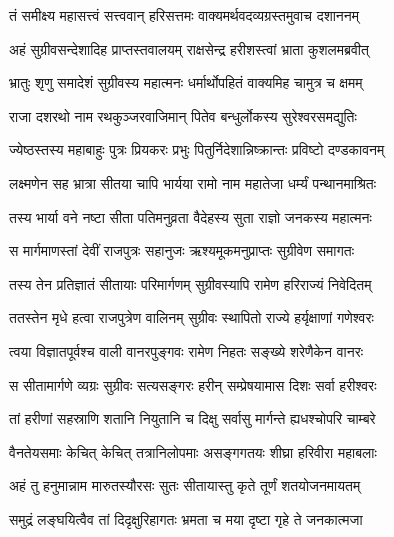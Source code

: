 
\textlink{}
\translink{}

\storymeta

\twolineshloka
{तं समीक्ष्य महासत्त्वं सत्त्ववान् हरिसत्तमः}
{वाक्यमर्थवदव्यग्रस्तमुवाच दशाननम्}

\twolineshloka
{अहं सुग्रीवसन्देशादिह प्राप्तस्तवालयम्}
{राक्षसेन्द्र हरीशस्त्वां भ्राता कुशलमब्रवीत्}

\twolineshloka
{भ्रातुः शृणु समादेशं सुग्रीवस्य महात्मनः}
{धर्मार्थोपहितं वाक्यमिह चामुत्र च क्षमम्}

\twolineshloka
{राजा दशरथो नाम रथकुञ्जरवाजिमान्}
{पितेव बन्धुर्लोकस्य सुरेश्वरसमद्युतिः}

\twolineshloka
{ज्येष्ठस्तस्य महाबाहुः पुत्रः प्रियकरः प्रभुः}
{पितुर्निदेशान्निष्क्रान्तः प्रविष्टो दण्डकावनम्}

\twolineshloka
{लक्ष्मणेन सह भ्रात्रा सीतया चापि भार्यया}
{रामो नाम महातेजा धर्म्यं पन्थानमाश्रितः}

\twolineshloka
{तस्य भार्या वने नष्टा सीता पतिमनुव्रता}
{वैदेहस्य सुता राज्ञो जनकस्य महात्मनः} 

\twolineshloka
{स मार्गमाणस्तां देवीं राजपुत्रः सहानुजः}
{ऋश्यमूकमनुप्राप्तः सुग्रीवेण समागतः}

\twolineshloka
{तस्य तेन प्रतिज्ञातं सीतायाः परिमार्गणम्}
{सुग्रीवस्यापि रामेण हरिराज्यं निवेदितम्}

\twolineshloka
{ततस्तेन मृधे हत्वा राजपुत्रेण वालिनम्}
{सुग्रीवः स्थापितो राज्ये हर्यृक्षाणां गणेश्वरः}

\twolineshloka
{त्वया विज्ञातपूर्वश्च वाली वानरपुङ्गवः}
{रामेण निहतः सङ्ख्ये शरेणैकेन वानरः}

\twolineshloka
{स सीतामार्गणे व्यग्रः सुग्रीवः सत्यसङ्गरः}
{हरीन् सम्प्रेषयामास दिशः सर्वा हरीश्वरः}

\twolineshloka
{तां हरीणां सहस्राणि शतानि नियुतानि च}
{दिक्षु सर्वासु मार्गन्ते ह्यधश्चोपरि चाम्बरे}

\twolineshloka
{वैनतेयसमाः केचित् केचित् तत्रानिलोपमाः}
{असङ्गगतयः शीघ्रा हरिवीरा महाबलाः}

\twolineshloka
{अहं तु हनुमान्नाम मारुतस्यौरसः सुतः}
{सीतायास्तु कृते तूर्णं शतयोजनमायतम्}

\twolineshloka
{समुद्रं लङ्घयित्वैव तां दिदृक्षुरिहागतः}
{भ्रमता च मया दृष्टा गृहे ते जनकात्मजा}

